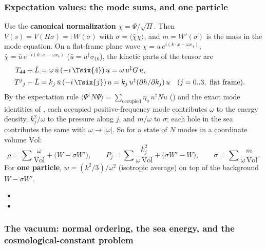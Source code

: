 \subsubsection{Expectation values: the mode sums, and one particle}
\label{sec:3.7.2}

Use the \textbf{canonical normalization} $\chi=\Psi/\sqrt H$. Then $V(s)=V(H\sigma)=:W(\sigma)$ with
$\sigma=\langle\bar\chi\chi\rangle$, and $m=W'(\sigma)$ is the mass in the mode equation. On a
flat-frame plane wave $\chi=u\,e^{i(k\cdot x-\omega x_4)}$, $\bar\chi=\bar u\,e^{-i(k\cdot x-\omega x_4)}$
($\bar u=u^{\ddagger}\sigma_{16}$), the kinetic parts of the tensor are
\begin{align*}
  T_{44}+\hat L&=\omega\,\bar u\,(-i\,\Tsix{4})\,u=\omega\,u^{\ddagger}G\,u,\\
  T^j{}_j-\hat L&=k_j\,\bar u\,(-i\,\Tsix{j})\,u=k_j\,u^{\ddagger}(\partial h/\partial k_j)\,u &&(j=0..3,\text{ flat frame}).
\end{align*}
By the expectation rule
$\langle\Psi^{\ddagger}N\Psi\rangle=\sum_{\text{occupied}}\eta_u\,u^{\dagger}Nu$ () and
the exact mode identities of , each occupied positive-frequency mode contributes
$\omega$ to the energy density, $k_j^2/\omega$ to the pressure along $j$, and $m/\omega$ to $\sigma$;
each hole in the sea contributes the same with $\omega\to|\omega|$. So for a state of $N$ modes in a
coordinate volume $\mathrm{Vol}$:
\[
  \rho=\sum\frac{\omega}{\mathrm{Vol}}+\bigl(W-\sigma W'\bigr),\qquad
  P_j=\sum\frac{k_j^2}{\omega\,\mathrm{Vol}}+\bigl(\sigma W'-W\bigr),\qquad
  \sigma=\sum\frac{m}{\omega\,\mathrm{Vol}} .
\]
For \textbf{one particle}, $w=(k^2/3)/\omega^2$ (isotropic average) on top of the background
$W-\sigma W'$. 
\begin{itemize}
  \item {}
  \item {}
\end{itemize}

\subsubsection{The vacuum: normal ordering, the sea energy, and the cosmological-constant problem}
\label{sec:3.7.3}

